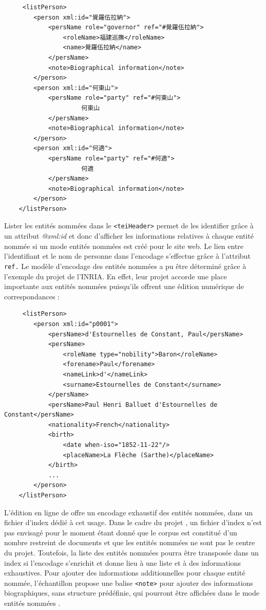 \begin{verbatim}
     <listPerson>
        <person xml:id="覺羅伍拉納">
            <persName role="governor" ref="#覺羅伍拉納">
                <roleName>福建巡撫</roleName>
                <name>覺羅伍拉納</name>
            </persName>
            <note>Biographical information</note>
        </person>
        <person xml:id="何東山">
            <persName role="party" ref="#何東山">
                     何東山
            </persName>
            <note>Biographical information</note>
        </person>
        <person xml:id="何適">
            <persName role="party" ref="#何適">
                     何適
            </persName>
            <note>Biographical information</note>
        </person>
    </listPerson>
\end{verbatim}
Lister les entités nommées dans le \texttt{<teiHeader>} permet de les identifier grâce à un attribut \textit{@xml:id} et donc d'afficher les informations relatives à chaque entité nommée si un mode \og entités nommées \fg est créé pour le site web. Le lien entre l'identifiant \XML et le nom de personne dans l'encodage s'effectue grâce à l'attribut \texttt{ref.} Le modèle d'encodage des entités nommées a pu être déterminé grâce à l'exemple du projet \disco de l'INRIA. En effet, leur projet accorde une place importante aux entités nommées puisqu'ils offrent une édition numérique de correspondances : 
\begin{verbatim}
     <listPerson>
        <person xml:id="p0001">
            <persName>d'Estournelles de Constant, Paul</persName>
            <persName>
                <roleName type="nobility">Baron</roleName>
                <forename>Paul</forename>
                <nameLink>d'</nameLink>
                <surname>Estournelles de Constant</surname>
            </persName>
            <persName>Paul Henri Balluet d'Estournelles de Constant</persName>
            <nationality>French</nationality>
            <birth>
                <date when-iso="1852-11-22"/>
                <placeName>La Flèche (Sarthe)</placeName>
            </birth>
            ...
        </person>
    </listPerson>
\end{verbatim}
L'édition en ligne de \disco offre un encodage exhaustif des entités nommées, dans un fichier d'index \TEI dédié à cet usage. Dans le cadre du projet \COREL, un fichier d'index n'est pas envisagé pour le moment étant donné que le corpus est constitué d'un nombre restreint de documents et que les entités nommées ne sont pas le centre du projet. Toutefois, la liste des entités nommées pourra être transposée dans un index si l'encodage s'enrichit et donne lieu à une liste et à des informations exhaustives. Pour ajouter des informations additionnelles pour chaque entité nommée, l'échantillon propose une balise \texttt{<note>} pour ajouter des informations biographiques, sans structure prédéfinie, qui pourront être affichées dans le mode \og entités nommées \fg. 

